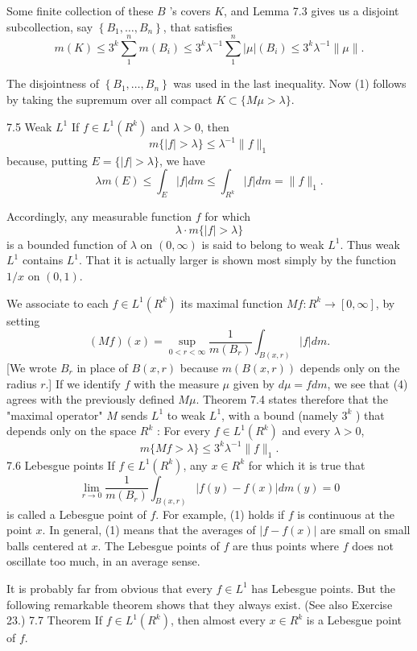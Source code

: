 Some finite collection of these $B$ 's covers $K$, and Lemma 7.3 gives us a disjoint subcollection, say $\left\{B_1, \ldots, B_n\right\}$, that satisfies
$$
m(K) \leq 3^k \sum_1^n m\left(B_i\right) \leq 3^k \lambda^{-1} \sum_1^n|\mu|\left(B_i\right) \leq 3^k \lambda^{-1}\|\mu\| .
$$

The disjointness of $\left\{B_1, \ldots, B_n\right\}$ was used in the last inequality.
Now (1) follows by taking the supremum over all compact $K \subset\{M \mu>\lambda\}$.

7.5 Weak $L^1$ If $f \in L^1\left(R^k\right)$ and $\lambda>0$, then
$$
m\{|f|>\lambda\} \leq \lambda^{-1}\|f\|_1
$$
because, putting $E=\{|f|>\lambda\}$, we have
$$
\lambda m(E) \leq \int_E|f| d m \leq \int_{R^k}|f| d m=\|f\|_1 .
$$

Accordingly, any measurable function $f$ for which
$$
\lambda \cdot m\{|f|>\lambda\}
$$
is a bounded function of $\lambda$ on $(0, \infty)$ is said to belong to weak $L^1$.
Thus weak $L^1$ contains $L^1$. That it is actually larger is shown most simply by the function $1 / x$ on $(0,1)$.

We associate to each $f \in L^1\left(R^k\right)$ its maximal function $M f: R^k \rightarrow[0, \infty]$, by setting
$$
(M f)(x)=\sup _{0<r<\infty} \frac{1}{m\left(B_r\right)} \int_{B(x, r)}|f| d m .
$$
[We wrote $B_r$ in place of $B(x, r)$ because $m(B(x, r))$ depends only on the radius $r$.] If we identify $f$ with the measure $\mu$ given by $d \mu=f d m$, we see that (4) agrees with the previously defined $M \mu$. Theorem 7.4 states therefore that the "maximal operator" $M$ sends $L^1$ to weak $L^1$, with a bound (namely $3^k$ ) that depends only on the space $R^k$ :
For every $f \in L^1\left(R^k\right)$ and every $\lambda>0$,
$$
m\{M f>\lambda\} \leq 3^k \lambda^{-1}\|f\|_1 .
$$
7.6 Lebesgue points If $f \in L^1\left(R^k\right)$, any $x \in R^k$ for which it is true that
$$
\lim _{r \rightarrow 0} \frac{1}{m\left(B_r\right)} \int_{B(x, r)}|f(y)-f(x)| d m(y)=0
$$
is called a Lebesgue point of $f$.
For example, (1) holds if $f$ is continuous at the point $x$. In general, (1) means that the averages of $|f-f(x)|$ are small on small balls centered at $x$. The Lebesgue points of $f$ are thus points where $f$ does not oscillate too much, in an average sense.

It is probably far from obvious that every $f \in L^1$ has Lebesgue points. But the following remarkable theorem shows that they always exist. (See also Exercise 23.)
7.7 Theorem If $f \in L^1\left(R^k\right)$, then almost every $x \in R^k$ is a Lebesgue point of $f$.

